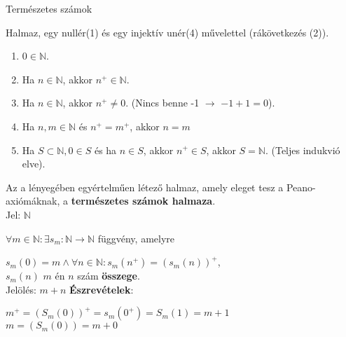 \begin{frame}
  \begin{tcolorbox}
    {\Huge Természetes számok}
  \end{tcolorbox}
\end{frame}

\begin{frame}
  \begin{tcolorbox}[title={Def.: Peano-axiómák}]
      Halmaz, egy nullér(1) és egy injektív unér(4) művelettel (rákövetkezés (2)).\\
      \mmedskip
      
      \begin{enumerate}
        \item $0 \in \mathbb{N}$.
        \item Ha $n \in \mathbb{N}$, akkor $n^+ \in \mathbb{N}$.
        \item Ha $n \in \mathbb{N}$, akkor $n^+ \neq 0$. (Nincs benne -1 $\rightarrow$ $-1 + 1 = 0$).
        \item Ha $n, m \in \mathbb{N}$ és $n^+ = m^+$, akkor $n = m$
        \item Ha $S \subset \mathbb{N}, 0 \in S$ és ha $n \in S$, akkor $n^+ \in S$, akkor $S = \mathbb{N}$. (Teljes indukvió elve).
      \end{enumerate}
  \end{tcolorbox}


  \begin{tcolorbox}[title={Def.: Természetes számok halmaza}]
    Az a lényegében egyértelműen létező halmaz, amely eleget tesz a Peano-axiómáknak, a \textbf{természetes számok halmaza}.\\
    Jel: $\mathbb{N}$
  \end{tcolorbox}
\end{frame}

\begin{frame}
  \begin{tcolorbox}[title={Def.: Összeadás}]
    ${\forall}m \in \mathbb{N} : {\exists} s_m : \mathbb{N} \rightarrow \mathbb{N}$ függvény, amelyre\\
    \mmedskip

    $s_m(0) = m \land {\forall}n \in \mathbb{N} : s_m(n^+) = (s_m(n))^+$,\\
    $s_m(n)$ $m$ én $n$ szám \textbf{összege}.\\
    Jelölés: $m + n$
  \tcblower
    \textbf{Észrevételek}:\\
    \mmedskip
  
    $m^+ = (S_m(0))^+ = s_m(0^+) = S_m(1) = m + 1$\\
    $m = (S_m(0)) = m + 0$
  \end{tcolorbox}
\end{frame}

